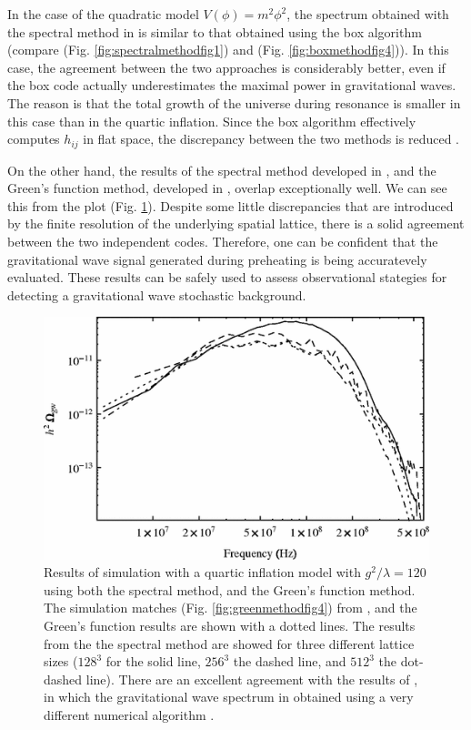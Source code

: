 \documentclass[11pt,a4paper,twoside]{book}
\begin{document}
 In the case of the quadratic model $ V(\phi)=m^{2}\phi^{2} $, the spectrum obtained with the spectral method in \cite{Chap7:SpectralMethod} is similar to that obtained using the box algorithm \cite{Chap7:BoxMethod} (compare (Fig. \ref{fig:spectralmethodfig1}) and (Fig. \ref{fig:boxmethodfig4})). In this case, the agreement between the two approaches is considerably better, even if the box code actually underestimates the maximal power in gravitational waves. The reason is that the total growth of the universe during resonance is smaller in this case than in the quartic inflation. Since the box algorithm effectively computes $ h_{ij} $ in flat space, the discrepancy between the two methods is reduced \cite{Chap7:SpectralMethodComparison}.

On the other hand, the results of the spectral method developed in \cite{Chap7:SpectralMethod}, and the Green's function method, developed in \cite{Chap7:GreenMethod}, overlap exceptionally well. We can see this from the plot (Fig. \ref{fig:comparisonfig13}).  Despite some little discrepancies that are introduced by the finite resolution of the underlying spatial lattice, there is a solid agreement between the two independent codes. Therefore, one can be confident that the gravitational wave signal generated during preheating is being accuratevely evaluated. These results can be safely used to assess observational stategies for detecting a gravitational wave stochastic background.
 \begin{figure}[h]
 	\centering
 	\includegraphics[width=0.65\linewidth, height=0.35\textheight]{Images/Chap7/Comparison_Fig13}
 	\caption{Results of simulation with a quartic inflation model with $ g^{2}/\lambda=120 $ using both the spectral method, and the Green's function method. The simulation matches (Fig. \ref{fig:greenmethodfig4}) from \cite{Chap7:GreenMethod}, and the Green's function results are shown with a dotted lines. The results from the the spectral method are showed for three different lattice sizes ($ 128^{3} $ for the solid line, $ 256^{3} $ the dashed line, and $ 512^{3} $ the dot-dashed line). There are an excellent agreement with the results of \cite{Chap7:GreenMethod}, in which the gravitational wave spectrum in obtained using a very different numerical algorithm \cite{Chap7:SpectralMethodComparison}.}
 	\label{fig:comparisonfig13}
 \end{figure}
\end{document}
